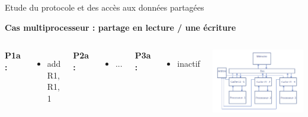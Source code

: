 \documentclass{beamer}
\begin{document}
\begin{frame}{Etude du protocole et des accès aux données partagées}
    \addtocounter{framenumber}{-1}
    \textbf{Cas multiprocesseur : partage en lecture / une écriture}
    \begin{columns}[c] %

        \textbf{P1a : }
        \begin{itemize}
            \item add R1, R1, 1
        \end{itemize}

        \textbf{P2a : }
        \begin{itemize}
            \item ...
        \end{itemize}

        \textbf{P3a : }
        \begin{itemize}
            \item inactif
        \end{itemize}

        \vspace{1cm}
        \includegraphics[scale=0.3]{archi.png}
        
    \end{columns}
\end{frame}
\end{document}
